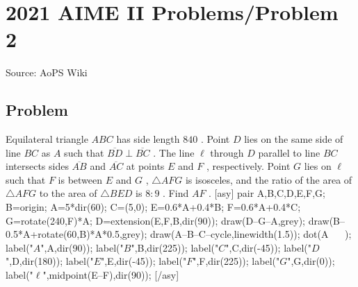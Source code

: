 \documentclass[12pt]{article}
\begin{document}
\section*{{2021 AIME II Problems/Problem 2}}
Source: AoPS Wiki

\subsection*{Problem}
Equilateral triangle $ABC$ has side length $840$ . Point $D$ lies on the same side of line $BC$ as $A$ such that $\overline{BD} \perp \overline{BC}$ . The line $\ell$ through $D$ parallel to line $BC$ intersects sides $\overline{AB}$ and $\overline{AC}$ at points $E$ and $F$ , respectively. Point $G$ lies on $\ell$ such that $F$ is between $E$ and $G$ , $\triangle AFG$ is isosceles, and the ratio of the area of $\triangle AFG$ to the area of $\triangle BED$ is $8:9$ . Find $AF$ . [asy] pair A,B,C,D,E,F,G; B=origin; A=5*dir(60); C=(5,0); E=0.6*A+0.4*B; F=0.6*A+0.4*C; G=rotate(240,F)*A; D=extension(E,F,B,dir(90)); draw(D--G--A,grey); draw(B--0.5*A+rotate(60,B)*A*0.5,grey); draw(A--B--C--cycle,linewidth(1.5)); dot(A^^B^^C^^D^^E^^F^^G); label("$A$",A,dir(90)); label("$B$",B,dir(225)); label("$C$",C,dir(-45)); label("$D$",D,dir(180)); label("$E$",E,dir(-45)); label("$F$",F,dir(225)); label("$G$",G,dir(0)); label("$\ell$",midpoint(E--F),dir(90)); [/asy]
\end{document}
